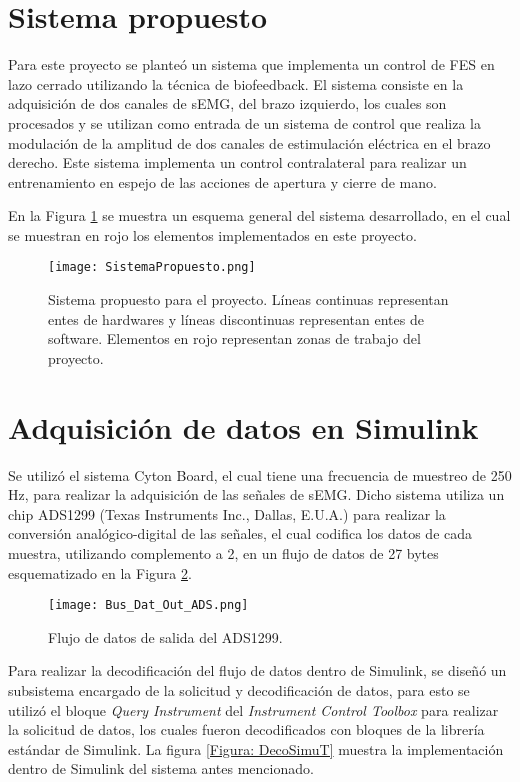 \section{Sistema propuesto}
Para este proyecto se planteó un sistema que implementa un control de FES en lazo cerrado utilizando la técnica de biofeedback. El sistema consiste en la adquisición de dos canales de sEMG, del brazo izquierdo, los cuales son procesados y se utilizan como entrada de un sistema de control que realiza la modulación de la amplitud de dos canales de estimulación eléctrica en el brazo derecho. Este sistema implementa un control contralateral para realizar un entrenamiento en espejo de las acciones de apertura y cierre de mano.

En la Figura \ref{Figura: SistProp} se muestra un esquema general del sistema desarrollado, en el cual se muestran en rojo los elementos implementados en este proyecto.

\begin{figure}[htbp]
\centering
	\texttt{[image: SistemaPropuesto.png]}
	\caption[Sistema propuesto para el proyecto]{Sistema propuesto para el proyecto. Líneas continuas representan entes de hardwares y líneas discontinuas representan entes de software. Elementos en rojo representan zonas de trabajo del proyecto.}
	\label{Figura: SistProp}
\end{figure}


\section{Adquisición de datos en Simulink}
Se utilizó el sistema Cyton Board, el cual tiene una frecuencia de muestreo de 250 Hz, para realizar la adquisición de las señales de sEMG. Dicho sistema utiliza un chip ADS1299 (Texas Instruments Inc., Dallas, E.U.A.) para realizar la conversión analógico-digital de las señales, el cual codifica los datos de cada muestra, utilizando complemento a 2, en un flujo de datos de 27 bytes esquematizado en la Figura \ref{Figura: BusOut}.

\begin{figure}[htbp]
\centering
	\texttt{[image: Bus\_Dat\_Out\_ADS.png]}
	\caption{Flujo de datos de salida del ADS1299.}
	\label{Figura: BusOut}
\end{figure}

Para realizar la decodificación del flujo de datos dentro de Simulink, se diseñó un subsistema encargado de la solicitud y decodificación de datos, para esto se utilizó el bloque \emph{Query Instrument} del \emph{Instrument Control Toolbox} para realizar la solicitud de datos, los cuales fueron decodificados con bloques de la librería estándar de Simulink. La figura \ref{Figura: DecoSimuT} muestra la implementación dentro de Simulink del sistema antes mencionado.

